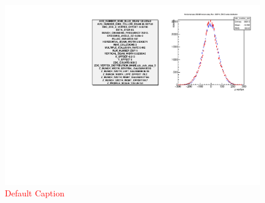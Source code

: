 \begin{figure}
\begin{center}
\includegraphics[width=\linewidth,height=\textheight,keepaspectratio]{./figures/359711_step05_config_compare}
\caption{ \textcolor{red}{Default Caption} }
\label{fig:359711_step05_config_compare}
\end{center}
\end{figure}
